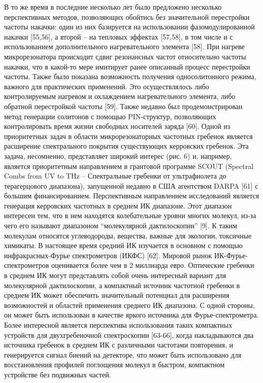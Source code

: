 В то же время в последние несколько лет было предложено несколько перспективных методов, позволяющих обойтись без значительной перестройки частоты накачки: один из них базируется на использовании фазомодулированной накачки [55,56], а второй – на тепловых эффектах [57,58], в том числе и с использованием дополнительного нагревательного элемента [58]. При нагреве микрорезонатора происходит сдвиг резонансных частот относительно частоты накачки, что в какой-то мере имитирует ранее описанный процесс перестройки частоты. Также было показана возможность получения односолитонного режима, важного для практических применений. Это осуществлялось либо контролируемым нагревом и охлаждением нагревательного элемента, либо обратной перестройкой частоты [59]. Также недавно был продемонстрирован метод генерации солитонов с помощью PIN-структур, позволяющих контролировать время жизни свободных носителей заряда [60].
Одной из приоритетных задач в области микрорезонаторных частотных гребенок является расширение спектрального покрытия существующих керровских гребенок. Эта задача, несомненно, представляет широкий интерес (рис. 6) и, например, является приоритетным направлением в грантовой программе SCOUT (Spectral Combs from UV to THz – Спектральные гребенки от ультрафиолета до терагерцового диапазона), запущенной недавно в США агентством DARPA [61] с большим финансированием.
Перспективным направлением исследований является генерация керровских частотных в среднем ИК диапазоне. Этот диапазон интересен тем, что в нем находятся колебательные уровни многих молекул, из-за чего его называют диапазоном “молекулярной дактилоскопии” [9]. К таким молекулам относятся углеводороды, вещества, важные для экологии, токсичные химикаты. В настоящее время средний ИК изучается в основном с помощью инфракрасных-Фурье спектрометров (ИКФС) [62]. Мировой рынок ИК-Фурье-спектрометров оценивается более чем в 2 миллиарда евро. Оптические гребенки в среднем ИК могут представлять собой очень интересный вариант для молекулярной дактилоскопии, а компактный источник частотной гребенки в среднем ИК может обеспечить значительный потенциал для расширения возможностей и областей применения среднего ИК диапазона. С одной стороны, он может быть использован в качестве яркого источника для Фурье-спектрометра. Более интересной является перспектива использования таких компактных устройств для двухгребеночной спектроскопии [63-66], когда накладываются два источника гребенок в среднем ИК с различными частотами повторения, и генерируется сигнал биений на детекторе, что может быть использовано для восстановления профилей поглощения молекул в быстром, компактном устройстве без подвижных частей.
